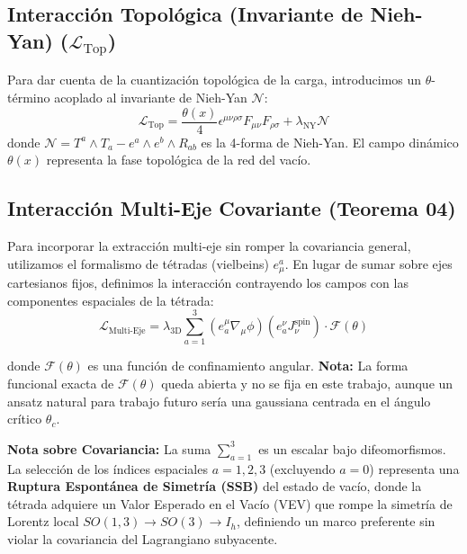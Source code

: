 \documentclass[12pt, a4paper]{article}
\begin{document}
\subsection{Interacción Topológica (Invariante de Nieh-Yan) ($\mathcal{L}_{\text{Top}}$)}
Para dar cuenta de la cuantización topológica de la carga, introducimos un $\theta$-término acoplado al invariante de Nieh-Yan $\mathcal{N}$:
\begin{equation}
    \mathcal{L}_{\text{Top}} = \frac{\theta(x)}{4} \epsilon^{\mu\nu\rho\sigma} F_{\mu\nu} F_{\rho\sigma} + \lambda_{\text{NY}} \mathcal{N}
\end{equation}
donde $\mathcal{N} = T^a \wedge T_a - e^a \wedge e^b \wedge R_{ab}$ es la 4-forma de Nieh-Yan. El campo dinámico $\theta(x)$ representa la fase topológica de la red del vacío.

\subsection{Interacción Multi-Eje Covariante (Teorema 04)}
Para incorporar la extracción multi-eje sin romper la covariancia general, utilizamos el formalismo de tétradas (vielbeins) $e^a_\mu$. En lugar de sumar sobre ejes cartesianos fijos, definimos la interacción contrayendo los campos con las componentes espaciales de la tétrada:
\begin{equation}
    \mathcal{L}_{\text{Multi-Eje}} = \lambda_{\text{3D}} \sum_{a=1}^{3} \left( e^\mu_a \nabla_\mu \phi \right) \left( e^\nu_a J_{\nu}^{\text{spin}} \right) \cdot \mathcal{F}(\theta)
\end{equation}

donde $\mathcal{F}(\theta)$ es una función de confinamiento angular. \textbf{Nota:} La forma funcional exacta de $\mathcal{F}(\theta)$ queda abierta y no se fija en este trabajo, aunque un ansatz natural para trabajo futuro sería una gaussiana centrada en el ángulo crítico $\theta_c$.

\textbf{Nota sobre Covariancia:} La suma $\sum_{a=1}^3$ es un escalar bajo difeomorfismos. La selección de los índices espaciales $a=1,2,3$ (excluyendo $a=0$) representa una \textbf{Ruptura Espontánea de Simetría (SSB)} del estado de vacío, donde la tétrada adquiere un Valor Esperado en el Vacío (VEV) que rompe la simetría de Lorentz local $SO(1,3) \to SO(3) \to I_h$, definiendo un marco preferente sin violar la covariancia del Lagrangiano subyacente.

\end{document}
